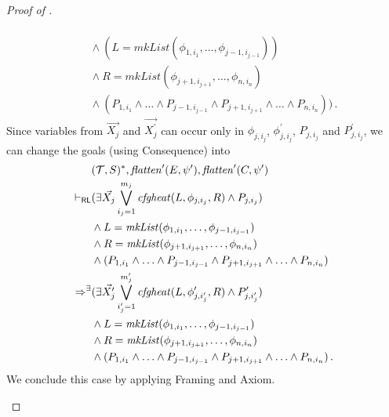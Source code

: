 \begin{proof}[Proof of ]
\begin{enumerate}
\begin{align*}
        \\&\quad \land (L = \mathit{mkList}(\phi_{1, i_1}, \ldots, \phi_{j-1, i_{j-1}}))
        \\&\quad \land R = \mathit{mkList}(\phi_{j+1, i_{j+1}}, \ldots, \phi_{n, i_{n}})
        \\&\quad \land (P_{1, i_1} \land \ldots \land P_{j-1, i_{j-1}} \land P_{j+1, i_{j+1}} \land \ldots \land P_{n, i_n})) \, .
    \end{align*}
    Since variables from $\vec{X_j}$ and $\vec{X_j^\prime}$ can occur only in $\phi_{j, i_j}$,
    $\phi^\prime_{j, i_j}$, $P_{j, i_j}$ and $P^\prime_{j, i_j}$, we can change the goals
    (using Consequence) into
    \begin{align*}
        & (\mathcal{T}, S)^*, \mathit{flatten}^\prime(E, \psi^\prime), \mathit{flatten}^\prime(C, \psi^\prime)
        \\ \vdash_{\mathsf{RL}} &
        (\exists \vec{X_j} \bigvee_{i_j=1}^{m_j} \mathit{cfgheat}(L, \phi_{j, i_j}, R) \land P_{j, i_j})
        \\&\land L = \mathit{mkList}(\phi_{1, i_1}, \ldots, \phi_{j-1, i_{j-1}})
        \\&\land R = \mathit{mkList}(\phi_{j+1, i_{j+1}}, \ldots, \phi_{n, i_{n}})
        \\&\land (P_{1, i_1} \land \ldots \land P_{j-1, i_{j-1}} \land P_{j+1, i_{j+1}} \land \ldots \land P_{n, i_n})
        \\ \Rightarrow^\exists &
        (\exists \vec{X^\prime_j} \bigvee_{i^\prime_j=1}^{m^\prime_j} \mathit{cfgheat}(L, \phi^\prime_{j, i^\prime_j}, R) \land P^\prime_{j, i^\prime_j})
        \\&\land L = \mathit{mkList}(\phi_{1, i_1}, \ldots, \phi_{j-1, i_{j-1}})
        \\&\land R = \mathit{mkList}(\phi_{j+1, i_{j+1}}, \ldots, \phi_{n, i_{n}})
        \\&\land (P_{1, i_1} \land \ldots \land P_{j-1, i_{j-1}} \land P_{j+1, i_{j+1}} \land \ldots \land P_{n, i_n}) \, .
    \end{align*}
    We conclude this case by applying Framing and Axiom.
    

\end{enumerate}
\end{proof}
